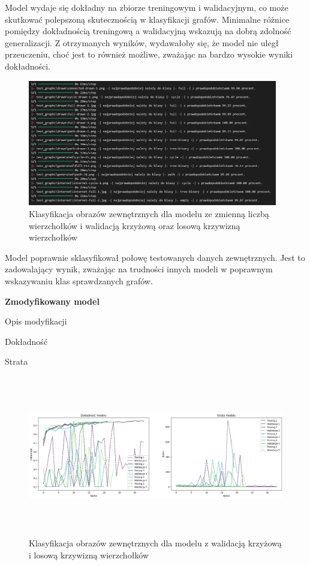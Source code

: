 Model wydaje się dokładny na zbiorze treningowym i walidacyjnym,
co może skutkować polepszoną skutecznością w klasyfikacji grafów.
Minimalne różnice pomiędzy dokładnością treningową a walidacyjną wskazują na dobrą zdolność generalizacji.
Z otrzymanych wyników, wydawałoby się, że model nie uległ przeuczeniu,
choć jest to również możliwe, zważając na bardzo wysokie wyniki dokładności. 

\begin{figure}[ht]
	\centering
	\includegraphics[height=5.5cm]{resources/tests/images/v3/multiple_edges_crossvalid_txt.png}
	\caption{Klasyfikacja obrazów zewnętrznych dla modelu ze zmienną liczbą wierzchołków i walidacją krzyżową oraz losową krzywizną wierzchołków}
	\label{Fig:tests-csvar-2}
\end{figure}
\FloatBarrier

Model poprawnie sklasyfikował połowę testowanych danych zewnętrznych.
Jest to zadowalający wynik, zważając na trudności innych modeli w poprawnym wskazywaniu klas sprawdzanych grafów.

\textbf{Zmodyfikowany model}

Opis modyfikacji %

Dokładność %

Strata %

\begin{figure}[ht]
	\centering
	\includegraphics[height=7cm]{resources/tests/images/v4/multiple_edges_crossvalid_upgraded_img.png}
	\caption{Klasyfikacja obrazów zewnętrznych dla modelu z walidacją krzyżową i losową krzywizną wierzchołków}
	\label{Fig:tests-var-2}
\end{figure}
\FloatBarrier

